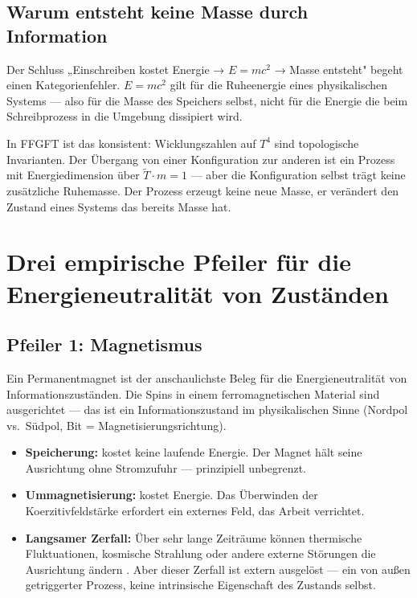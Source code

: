 \subsection{Warum entsteht keine Masse durch Information}

Der Schluss „Einschreiben kostet Energie → $E=mc^2$ → Masse entsteht"
begeht einen Kategorienfehler. $E=mc^2$ gilt für die Ruheenergie eines
physikalischen Systems — also für die Masse des Speichers selbst, nicht
für die Energie die beim Schreibprozess in die Umgebung dissipiert wird.

In FFGFT ist das konsistent: Wicklungszahlen auf $T^4$ sind topologische
Invarianten. Der Übergang von einer Konfiguration zur anderen ist ein
Prozess mit Energiedimension über $\tilde{T}\cdot m=1$ — aber die
Konfiguration selbst trägt keine zusätzliche Ruhemasse. Der Prozess
erzeugt keine neue Masse, er verändert den Zustand eines Systems das
bereits Masse hat.

\section{Drei empirische Pfeiler für die Energieneutralität von Zuständen}

\subsection{Pfeiler 1: Magnetismus}

Ein Permanentmagnet ist der anschaulichste Beleg für die Energieneutralität
von Informationszuständen. Die Spins in einem ferromagnetischen Material sind
ausgerichtet — das ist ein Informationszustand im physikalischen Sinne
(Nordpol vs.\ Südpol, Bit = Magnetisierungsrichtung).

\begin{itemize}
  \item \textbf{Speicherung:} kostet keine laufende Energie. Der Magnet
        hält seine Ausrichtung ohne Stromzufuhr — prinzipiell unbegrenzt.
  \item \textbf{Ummagnetisierung:} kostet Energie. Das Überwinden der
        Koerzitivfeldstärke erfordert ein externes Feld, das Arbeit verrichtet.
  \item \textbf{Langsamer Zerfall:} Über sehr lange Zeiträume können
        thermische Fluktuationen, kosmische Strahlung oder andere externe
        Störungen die Ausrichtung ändern \cite{Nattermann1990}. Aber dieser
        Zerfall ist extern ausgelöst — ein von außen getriggerter Prozess,
        keine intrinsische Eigenschaft des Zustands selbst.
\end{itemize}


